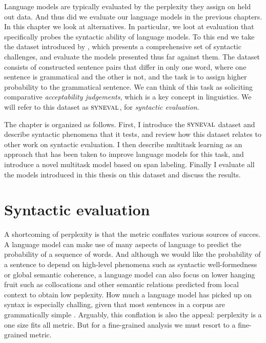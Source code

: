% 

Language models are typically evaluated by the perplexity they assign on held out data. And thus did we evaluate our language models in the previous chapters. In this chapter we look at alternatives. In particular, we loot at evaluation that specifically probes the syntactic ability of language models. To this end we take the dataset introduced by \citet{linzen2018targeted}, which presents a comprehensive set of syntactic challenges, and evaluate the models presented thus far against them. The dataset consists of constructed sentence pairs that differ in only one word, where one sentence is grammatical and the other is not, and the task is to assign higher probability to the grammatical sentence. We can think of this task as soliciting comparative \textit{acceptability judgements}, which is a key concept in linguistics. We will refer to this dataset as $\textsc{syneval}$, for \textit{syntactic evaluation}.

The chapter is organized as follows. First, I introduce the $\textsc{syneval}$ dataset and describe syntactic phenomena that it tests, and review how this dataset relates to other work on syntactic evaluation. I then describe multitask learning as an approach that has been taken to improve language models for this task, and introduce a novel multitask model based on span labeling. Finally I evaluate all the models introduced in this thesis on this dataset and discuss the results.

\section{Syntactic evaluation}
A shortcoming of perplexity is that the metric conflates various sources of succes. A language model can make use of many aspects of language to predict the probability of a sequence of words. And although we would like the probability of a sentence to depend on high-level phenomena such as syntactic well-formedness or global semantic coherence, a language model can also focus on lower hanging fruit such as collocations and other semantic relations predicted from local context to obtain low peplexity. How much a language model has picked up on syntax is especially challing, given that most sentences in a corpus are grammatically simple \citep{linzen2018targeted}. Arguably, this conflation is also the appeal: perplexity is a one size fits all metric. But for a fine-grained analysis we must resort to a fine-grained metric.

